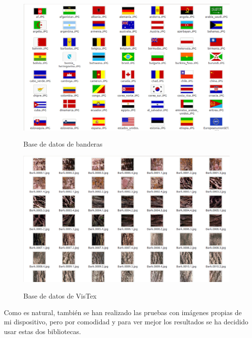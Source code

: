 \begin{figure}[H] %
\centering
\includegraphics[scale=0.4]{imagenes/banderas.png}  %
\label{banderas}
\caption{Base de datos de banderas}
\end{figure}

\begin{figure}[H] %
\centering
\includegraphics[scale=0.4]{imagenes/texturas.png}  %
\label{texturas}
\caption{Base de datos de VisTex}
\end{figure}

Como es natural, también se han realizado las pruebas con imágenes propias de mi dispositivo, pero por comodidad y para ver mejor los resultados se ha decidido usar estas dos bibliotecas.


